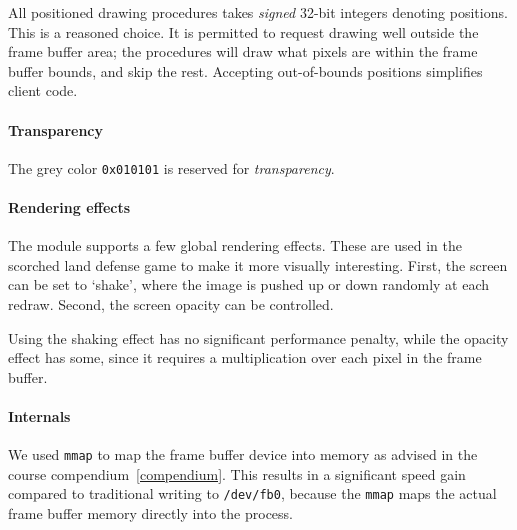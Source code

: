 \documentclass[a4paper,10pt]{article}
\newcommand{\isrc}[1]{\texttt{#1}}
\begin{document}
All positioned drawing procedures takes \emph{signed} 32-bit integers denoting
positions. This is a reasoned choice. It is permitted to request drawing well
outside the frame buffer area; the procedures will draw what pixels are within
the frame buffer bounds, and skip the rest. Accepting out-of-bounds positions
simplifies client code.

\paragraph{Transparency}
The grey color \isrc{0x010101} is reserved for \emph{transparency}.

\paragraph{Rendering effects}
The module supports a few global rendering effects. These are used in the
scorched land defense game to make it more visually interesting. First, the
screen can be set to `shake', where the image is pushed up or down randomly at
each redraw. Second, the screen opacity can be controlled.

Using the shaking effect has no significant performance penalty, while the
opacity effect has some, since it requires a multiplication over each pixel in
the frame buffer.

\paragraph{Internals}
We used \isrc{mmap} to map the frame buffer device into memory as advised in
the course compendium~\ref{compendium}. This results in a significant speed
gain compared to traditional writing to \texttt{/dev/fb0}, because the
\isrc{mmap} maps the actual frame buffer memory directly into the process.
\end{document}

